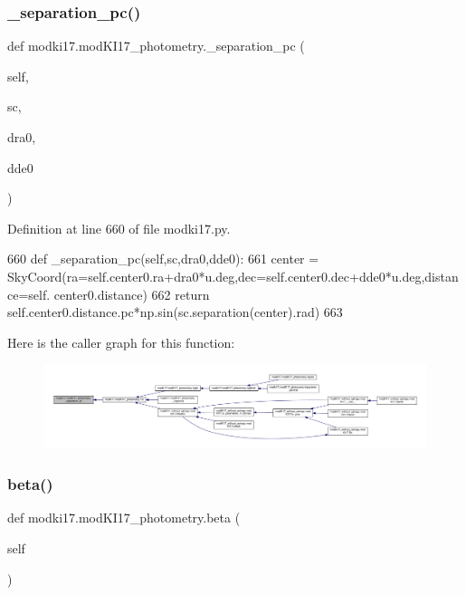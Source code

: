 \subsubsection{\texorpdfstring{\+\_\+separation\+\_\+pc()}{\_separation\_pc()}}
{\footnotesize\ttfamily def modki17.\+mod\+K\+I17\+\_\+photometry.\+\_\+separation\+\_\+pc (\begin{DoxyParamCaption}\item[{}]{self,  }\item[{}]{sc,  }\item[{}]{dra0,  }\item[{}]{dde0 }\end{DoxyParamCaption})\hspace{0.3cm}{\ttfamily [private]}}



Definition at line 660 of file modki17.\+py.


\begin{DoxyCode}
660     \textcolor{keyword}{def }\_separation\_pc(self,sc,dra0,dde0):
661         center = SkyCoord(ra=self.center0.ra+dra0*u.deg,dec=self.center0.dec+dde0*u.deg,distance=self.
      center0.distance)
662         \textcolor{keywordflow}{return} self.center0.distance.pc*np.sin(sc.separation(center).rad)
663     
\end{DoxyCode}
Here is the caller graph for this function\+:\nopagebreak
\begin{figure}[H]
\begin{center}
\leavevmode
\includegraphics[width=350pt]{dd/db2/classmodki17_1_1modKI17__photometry_af64d278fc0d7f4161dd13abf005ce8c8_icgraph}
\end{center}
\end{figure}
\mbox{\label{classmodki17_1_1modKI17__photometry_a7038c9a4666ac8568838f51f9a4d9c21}} 
\subsubsection{\texorpdfstring{beta()}{beta()}}
{\footnotesize\ttfamily def modki17.\+mod\+K\+I17\+\_\+photometry.\+beta (\begin{DoxyParamCaption}\item[{}]{self }\end{DoxyParamCaption})}



